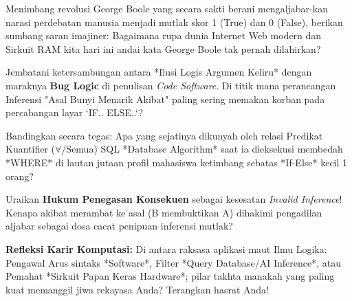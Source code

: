 \documentclass[../main]{subfiles}
\begin{document}

\begin{latihan}
  \item Menimbang revolusi George Boole yang secara sakti berani mengaljabar-kan narasi perdebatan manusia menjadi mutlak skor 1 (True) dan 0 (False), berikan sumbang saran imajiner: Bagaimana rupa dunia Internet Web modern dan Sirkuit RAM kita hari ini andai kata George Boole tak pernah dilahirkan?
  \item Jembatani ketersambungan antara *Ilusi Logis Argumen Keliru* dengan maraknya \textbf{Bug Logic} di penulisan \textit{Code Software}. Di titik mana perancangan Inferensi "Asal Bunyi Menarik Akibat" paling sering memakan korban pada percabangan layar `IF.. ELSE..`?
  \item Bandingkan secara tegas: Apa yang sejatinya dikunyah oleh relasi Predikat Kuantifier ($\forall$/Semua) SQL *Database Algorithm* saat ia dieksekusi membedah *WHERE* di lautan jutaan profil mahasiswa ketimbang sebatas *If-Else* kecil 1 orang?
  \item Uraikan \textbf{Hukum Penegasan Konsekuen} sebagai kesesatan \textit{Invalid Inference}! Kenapa akibat merambat ke asal (B membuktikan A) dihakimi pengadilan aljabar sebagai dosa cacat penipuan inferensi mutlak?
  \item \textbf{Refleksi Karir Komputasi:} Di antara raksasa aplikasi maut Ilmu Logika: Pengawal Arus sintaks *Software*, Filter *Query Database/AI Inference*, atau Pemahat *Sirkuit Papan Keras Hardware*; pilar takhta manakah yang paling kuat memanggil jiwa rekayasa Anda? Terangkan hasrat Anda!
\end{latihan}

\end{document}
